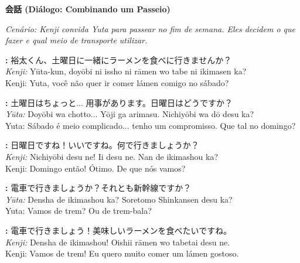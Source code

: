\documentclass[12pt,a4paper]{article}
\begin{document}
\newpage

\begin{center}
    {\LARGE\bfseries 会話 (Diálogo: Combinando um Passeio)}
\end{center}

\textit{Cenário: Kenji convida Yuta para passear no fim de semana. Eles decidem o que fazer e qual meio de transporte utilizar.}

\vspace{0.8em}

\textbf{:} 裕太くん、土曜日に一緒にラーメンを食べに行きませんか？\\
\textit{Kenji:} Yūta-kun, doyōbi ni issho ni rāmen wo tabe ni ikimasen ka?\\
Kenji: Yuta, você não quer ir comer lámen comigo no sábado?

\vspace{0.4em}

\textbf{:} 土曜日はちょっと... 用事があります。日曜日はどうですか？\\
\textit{Yūta:} Doyōbi wa chotto... Yōji ga arimasu. Nichiyōbi wa dō desu ka?\\
Yuta: Sábado é meio complicado... tenho um compromisso. Que tal no domingo?

\vspace{0.4em}

\textbf{:} 日曜日ですね！いいですね。何で行きましょうか？\\
\textit{Kenji:} Nichiyōbi desu ne! Ii desu ne. Nan de ikimashou ka?\\
Kenji: Domingo então! Ótimo. De que nós vamos?

\vspace{0.4em}

\textbf{:} 電車で行きましょうか？それとも新幹線ですか？\\
\textit{Yūta:} Densha de ikimashou ka? Soretomo Shinkansen desu ka?\\
Yuta: Vamos de trem? Ou de trem-bala?

\vspace{0.4em}

\textbf{:} 電車で行きましょう！美味しいラーメンを食べたいですね。\\
\textit{Kenji:} Densha de ikimashou! Oishii rāmen wo tabetai desu ne.\\
Kenji: Vamos de trem! Eu quero muito comer um lámen gostoso.

\vspace{0.4em}
\end{document}
